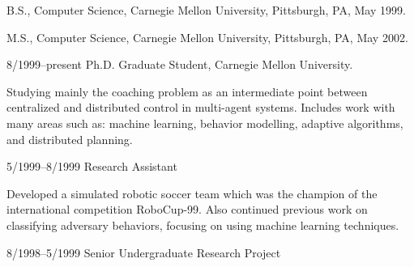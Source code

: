 \documentclass[ComputerScience]{vita}
\begin{document}


\begin{vita}
  
  
  \begin{Degrees}
   \item B.S., Computer Science, Carnegie Mellon University,
    Pittsburgh, PA, May 1999.
   \item M.S., Computer Science, Carnegie Mellon University,
    Pittsburgh, PA, May 2002.
  \end{Degrees}


  \begin{Research Experience}
   \item 8/1999--present Ph.D. Graduate Student, Carnegie Mellon University.
    
    Studying mainly the coaching problem as an intermediate point
    between centralized and distributed control in multi-agent
    systems. Includes work with many areas such as: machine
    learning, behavior modelling, adaptive algorithms, and distributed
    planning. 

   \item 5/1999--8/1999 Research Assistant
    
    Developed a simulated robotic soccer team which was the champion
    of the international competition RoboCup-99. Also continued
    previous work on classifying adversary behaviors, focusing on
    using machine learning techniques.

   \item 8/1998--5/1999 Senior Undergraduate Research Project


\end{Research Experience}
\end{vita}
\end{document}

